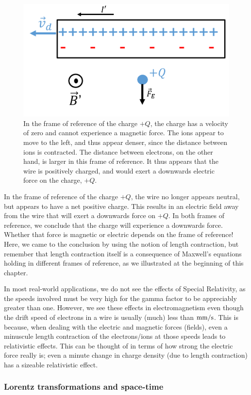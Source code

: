 \begin{figure}[!htbp]
\centering
\includegraphics[width=0.5\linewidth]{files/current_ions-de3896591af7b6dd91be2e91dddf5da7.png}
\caption[]{In the frame of reference of the charge $+Q$, the charge has a velocity of zero and cannot experience a magnetic force. The ions appear to move to the left, and thus appear denser, since the distance between ions is contracted. The distance between electrons, on the other hand, is larger in this frame of reference. It thus appears that the wire is positively charged, and would exert a downwards electric force on the charge, $+Q$.}
\label{fig:specialrelativity:current_ions}
\end{figure}

In the frame of reference of the charge $+Q$, the wire no longer appears neutral, but appears to have a net positive charge. This results in an electric field away from the wire that will exert a downwards force on $+Q$. In both frames of reference, we conclude that the charge will experience a downwards force. Whether that force is magnetic or electric depends on the frame of reference! Here, we came to the conclusion by using the notion of length contraction, but remember that length contraction itself is a consequence of Maxwell's equations holding in different frames of reference, as we illustrated at the beginning of this chapter.

In most real-world applications, we do not see the effects of Special Relativity, as the speeds involved must be very high for the gamma factor to be appreciably greater than one. However, we see these effects in electromagnetism even though the drift speed of electrons in a wire is usually (much) less than ${\rm mm/s}$. This is because, when dealing with the electric and magnetic forces (fields), even a minuscule length contraction of the electrons/ions at those speeds leads to relativistic effects. This can be thought of in terms of how strong the electric force really is; even a minute change in charge density (due to length contraction) has a sizeable relativistic effect.

\subsubsection{Lorentz transformations and space-time}

